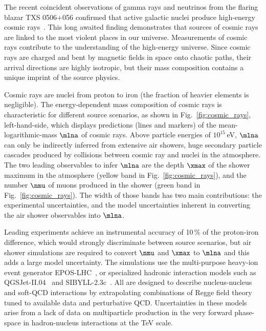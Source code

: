 \documentclass[../report.tex]{subfiles}
\begin{document}
The recent coincident observations of gamma rays and neutrinos from the flaring blazar TXS 0506+056 confirmed that active galactic nuclei produce high-energy cosmic rays~\cite{IceCube:2018dnn}. This long awaited finding demonstrates that sources of cosmic rays are linked to the most violent places in our universe. Measurements of cosmic rays contribute to the understanding of the high-energy universe. Since cosmic rays are charged and bent by magnetic fields in space onto chaotic paths, their arrival directions are highly isotropic, but their mass composition contains a unique imprint of the source physics.

Cosmic rays are nuclei from proton to iron (the fraction of heavier elements is negligible). The energy-dependent mass composition of cosmic rays is characteristic for different source scenarios, as shown in Fig.~\ref{fig:cosmic_rays}, left-hand-side, which displays predictions (lines and markers) of the mean-logarithmic-mass $\mlna$ of cosmic rays. Above particle energies of $10^{15}$\,\si{eV}, $\mlna$ can only be indirectly inferred from extensive air showers, huge secondary particle cascades produced by collisions between cosmic ray and nuclei in the atmosphere. The two leading observables to infer $\mlna$ are the depth $\xmax$ of the shower maximum in the atmosphere (yellow band in Fig.~\ref{fig:cosmic_rays}), and the number $\nmu$ of muons produced in the shower (green band in Fig.~\ref{fig:cosmic_rays}). The width of those bands has two main contributions: the experimental uncertainties, and the model uncertainties inherent in converting the air shower observables into $\mlna$.

Leading experiments achieve an instrumental accuracy of 10\,\% of the proton-iron difference, which would strongly discriminate between source scenarios, but air shower simulations are required to convert $\nmu$ and $\xmax$ to $\mlna$ and this adds a large model uncertainty. The simulations use the multi-purpose heavy-ion event generator EPOS-LHC~\cite{Werner:2005jf}, or specialized hadronic interaction models such as \mbox{QGSJet-II.04}~\cite{Ostapchenko:2010vb} and SIBYLL-2.3c~\cite{Riehn:2017mfm}. All are designed to describe nucleus-nucleus and soft-QCD interactions by extrapolating combinations of Regge field theory tuned to available data and perturbative QCD. Uncertainties in these models arise from a lack of data on multiparticle production in the very forward phase-space in hadron-nucleus interactions at the TeV scale.
\end{document}
